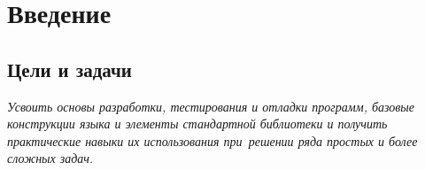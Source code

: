 
\chapter{Введение}

\section{Цели и задачи}
\textit{Усвоить основы разработки, тестирования и отладки программ, базовые конструкции языка  и элементы стандартной библиотеки и получить практические навыки их использования при~решении ряда простых и более сложных задач.}

